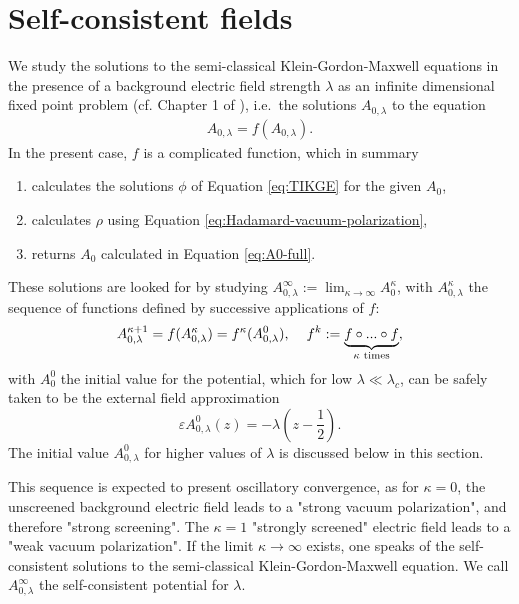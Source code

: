 \section{Self-consistent fields}

We study the solutions to the semi-classical Klein-Gordon-Maxwell equations in the presence of a background electric field strength $\lambda$ as an infinite dimensional fixed point problem (cf. Chapter 1 of \cite{Temam1997}), i.e.~the solutions $A_{0, \lambda}$ to the equation 
\begin{align}
    A_{0, \lambda} = f(A_{0, \lambda}).
    \label{eq:update-law}
\end{align}
In the present case, $f$ is a complicated function, which in summary
\begin{enumerate}
    \item calculates the solutions $\phi$ of Equation \eqref{eq:TIKGE} for the given $A_0$,
    \item calculates $\rho$ using Equation \eqref{eq:Hadamard-vacuum-polarization},
    \item returns $A_0$ calculated in Equation \eqref{eq:A0-full}.
\end{enumerate}
These solutions are looked for by studying $A_{0, \lambda}^\infty := \lim_{\kappa\to \infty}A_0^\kappa$, with $A_{0, \lambda}^\kappa$ the sequence of functions defined by successive applications of $f$:
\begin{align}
    A_{0, \lambda}^{\kappa+1} = f(A_{0, \lambda}^\kappa) = f^\kappa(A_{0, \lambda}^0),\hspace{0.4cm}f^k := \underbrace{f\circ ... \circ f}_{\kappa \text{ times}},
\end{align}
with $A_0^0$ the initial value for the potential, which for low $\lambda\ll \lambda_c$, can be safely taken to be the external field approximation
$$
\varepsilon A_{0, \lambda}^0(z) = -\lambda \left(z- \frac{1}{2}\right).
$$
The initial value $A_{0, \lambda}^0$ for higher values of $\lambda$ is discussed below in this section.

This sequence is expected to present oscillatory convergence, as for $\kappa=0$, the unscreened background electric field leads to a "strong vacuum polarization", and therefore "strong screening". The $\kappa=1$ "strongly screened" electric field leads to a "weak vacuum polarization". If the limit $\kappa\to\infty$ exists, one speaks of the self-consistent solutions to the semi-classical Klein-Gordon-Maxwell equation. We call $A_{0, \lambda}^\infty$ the self-consistent potential for $\lambda$.

